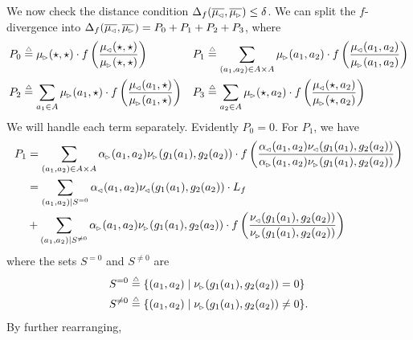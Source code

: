 \documentclass{lmcs}
\begin{document}
  We now check the distance condition
  $\Delta_f(\overline{\mu\lside}, \overline{\mu\rside}) \leq \delta$.
  We can split the $f$-divergence into $\Delta_f(\overline{\mu\lside},
  \overline{\mu\rside}) = P_0 + P_1 + P_2 + P_3$, where
  \begin{align*}
    P_0 &\eqdef \mu\rside(\star, \star)
    \cdot f \left( \frac{\mu\lside(\star, \star)}{\mu\rside(\star, \star)}
    \right)
    &P_1 &\eqdef \sum_{(a_1, a_2) \in A \times A} \mu\rside(a_1, a_2)
    \cdot f \left( \frac{\mu\lside(a_1, a_2)}{\mu\rside(a_1, a_2)} \right) \\
    P_2 &\eqdef \sum_{a_1 \in A} \mu\rside(a_1, \star)
    \cdot f \left( \frac{\mu\lside(a_1, \star)}{\mu\rside(a_1, \star)} \right)
    &P_3 &\eqdef \sum_{a_2 \in A} \mu\rside(\star, a_2)
    \cdot f \left( \frac{\mu\lside(\star, a_2)}{\mu\rside(\star, a_2)} \right)
  \end{align*}
  We will handle each term separately. Evidently $P_0 = 0$. For $P_1$, we have
  \begin{align*}
    P_1 &= \sum_{(a_1, a_2) \in A \times A} \alpha\rside(a_1, a_2)
    \nu\rside(g_1(a_1), g_2(a_2))
    \cdot f \left( \frac{\alpha\lside(a_1, a_2) \nu\lside(g_1(a_1), g_2(a_2))}
      {\alpha\rside(a_1, a_2) \nu\rside(g_1(a_1), g_2(a_2))} \right) \\
    &=
    \sum_{(a_1, a_2) \mid S^{= 0}} \alpha\lside(a_1, a_2) \nu\lside(g_1(a_1), g_2(a_2)) \cdot L_f \\
    &+ \sum_{(a_1, a_2) \mid S^{\neq 0}}
    \alpha\rside(a_1, a_2) \nu\rside(g_1(a_1), g_2(a_2))
    \cdot f \left( \frac{\nu\lside(g_1(a_1), g_2(a_2))} {\nu\rside(g_1(a_1), g_2(a_2))} \right) 
  \end{align*}
  where the sets $S^{=0}$ and $S^{\neq 0}$ are
  \begin{align*}
  S^{=0} &\eqdef \{ (a_1, a_2) \mid \nu\rside(g_1(a_1), g_2(a_2)) = 0 \} \\
  S^{\neq 0} &\eqdef \{ (a_1, a_2) \mid \nu\rside(g_1(a_1), g_2(a_2)) \neq 0 \}.
  \end{align*}
  By further rearranging,
\end{document}
